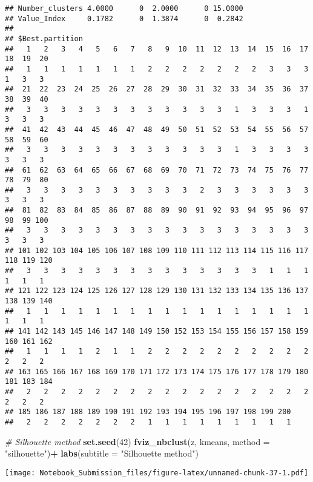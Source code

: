 \documentclass[
]{article}
\newenvironment{Shaded}{\begin{snugshade}}{\end{snugshade}}
\newcommand{\CommentTok}[1]{\textcolor[rgb]{0.56,0.35,0.01}{\textit{#1}}}
\newcommand{\DataTypeTok}[1]{\textcolor[rgb]{0.13,0.29,0.53}{#1}}
\newcommand{\DecValTok}[1]{\textcolor[rgb]{0.00,0.00,0.81}{#1}}
\newcommand{\KeywordTok}[1]{\textcolor[rgb]{0.13,0.29,0.53}{\textbf{#1}}}
\newcommand{\NormalTok}[1]{#1}
\newcommand{\OperatorTok}[1]{\textcolor[rgb]{0.81,0.36,0.00}{\textbf{#1}}}
\newcommand{\StringTok}[1]{\textcolor[rgb]{0.31,0.60,0.02}{#1}}
\begin{document}
\begin{verbatim}
## Number_clusters 4.0000      0  2.0000      0 15.0000
## Value_Index     0.1782      0  1.3874      0  0.2842
## 
## $Best.partition
##   1   2   3   4   5   6   7   8   9  10  11  12  13  14  15  16  17  18  19  20 
##   1   1   1   1   1   1   1   2   2   2   2   2   2   2   3   3   3   1   3   3 
##  21  22  23  24  25  26  27  28  29  30  31  32  33  34  35  36  37  38  39  40 
##   3   3   3   3   3   3   3   3   3   3   3   3   1   3   3   3   1   3   3   3 
##  41  42  43  44  45  46  47  48  49  50  51  52  53  54  55  56  57  58  59  60 
##   3   3   3   3   3   3   3   3   3   3   3   3   1   3   3   3   3   3   3   3 
##  61  62  63  64  65  66  67  68  69  70  71  72  73  74  75  76  77  78  79  80 
##   3   3   3   3   3   3   3   3   3   3   2   3   3   3   3   3   3   3   3   3 
##  81  82  83  84  85  86  87  88  89  90  91  92  93  94  95  96  97  98  99 100 
##   3   3   3   3   3   3   3   3   3   3   3   3   3   3   3   3   3   3   3   3 
## 101 102 103 104 105 106 107 108 109 110 111 112 113 114 115 116 117 118 119 120 
##   3   3   3   3   3   3   3   3   3   3   3   3   3   3   1   1   1   1   1   1 
## 121 122 123 124 125 126 127 128 129 130 131 132 133 134 135 136 137 138 139 140 
##   1   1   1   1   1   1   1   1   1   1   1   1   1   1   1   1   1   1   1   1 
## 141 142 143 145 146 147 148 149 150 152 153 154 155 156 157 158 159 160 161 162 
##   1   1   1   1   2   1   1   2   2   2   2   2   2   2   2   2   2   2   2   2 
## 163 165 166 167 168 169 170 171 172 173 174 175 176 177 178 179 180 181 183 184 
##   2   2   2   2   2   2   2   2   2   2   2   2   2   2   2   2   2   2   2   2 
## 185 186 187 188 189 190 191 192 193 194 195 196 197 198 199 200 
##   2   2   2   2   2   2   2   1   1   1   1   1   1   1   1   1
\end{verbatim}

\begin{Shaded}
\begin{Highlighting}[]
\CommentTok{# Silhouette method}
\KeywordTok{set.seed}\NormalTok{(}\DecValTok{42}\NormalTok{)}
\KeywordTok{fviz_nbclust}\NormalTok{(z, kmeans, }\DataTypeTok{method =} \StringTok{"silhouette"}\NormalTok{)}\OperatorTok{+}
\StringTok{  }\KeywordTok{labs}\NormalTok{(}\DataTypeTok{subtitle =} \StringTok{"Silhouette method"}\NormalTok{)}
\end{Highlighting}
\end{Shaded}

\texttt{[image: Notebook\_Submission\_files/figure-latex/unnamed-chunk-37-1.pdf]}
\end{document}
